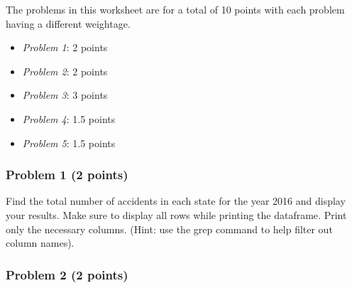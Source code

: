 \documentclass[
]{article}
\newenvironment{Shaded}{\begin{snugshade}}{\end{snugshade}}
\newcommand{\AttributeTok}[1]{\textcolor[rgb]{0.77,0.63,0.00}{#1}}
\newcommand{\CommentTok}[1]{\textcolor[rgb]{0.56,0.35,0.01}{\textit{#1}}}
\newcommand{\ConstantTok}[1]{\textcolor[rgb]{0.00,0.00,0.00}{#1}}
\newcommand{\DecValTok}[1]{\textcolor[rgb]{0.00,0.00,0.81}{#1}}
\newcommand{\FunctionTok}[1]{\textcolor[rgb]{0.00,0.00,0.00}{#1}}
\newcommand{\NormalTok}[1]{#1}
\newcommand{\OtherTok}[1]{\textcolor[rgb]{0.56,0.35,0.01}{#1}}
\newcommand{\StringTok}[1]{\textcolor[rgb]{0.31,0.60,0.02}{#1}}
\providecommand{\tightlist}{%
  \setlength{\itemsep}{0pt}\setlength{\parskip}{0pt}}
\begin{document}
The problems in this worksheet are for a total of 10 points with each
problem having a different weightage.

\begin{itemize}
\tightlist
\item
  \emph{Problem 1}: 2 points
\item
  \emph{Problem 2}: 2 points
\item
  \emph{Problem 3}: 3 points
\item
  \emph{Problem 4}: 1.5 points
\item
  \emph{Problem 5}: 1.5 points
\end{itemize}

\hypertarget{problem-1-2-points}{%
\subsubsection{Problem 1 (2 points)}\label{problem-1-2-points}}

Find the total number of accidents in each state for the year 2016 and
display your results. Make sure to display all rows while printing the
dataframe. Print only the necessary columns. (Hint: use the grep command
to help filter out column names).

\begin{Shaded}
\end{Shaded}

\hypertarget{problem-2-2-points}{%
\subsubsection{Problem 2 (2 points)}\label{problem-2-2-points}}
\end{document}
